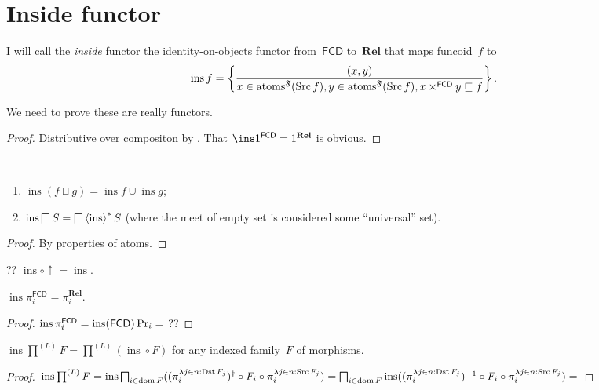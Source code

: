 \chapter{Inside functor}

\begin{defn}
I will call the \emph{inside} functor the identity-on-objects functor from~$\mathsf{FCD}$ to~$\mathbf{Rel}$ that maps
funcoid~$f$ to
\[
\operatorname{ins} f =
\left\{ \frac{(x,y)}{x\in\operatorname{atoms}^{\mathfrak{F}}(\operatorname{Src} f), y\in\operatorname{atoms}^{\mathfrak{F}}(\operatorname{Src} f), x\times^{\mathsf{FCD}}y\sqsubseteq f}\right\}. \]
\end{defn}

We need to prove these are really functors.

\begin{proof}
Distributive over compositon by \cite[proposition~]{volume-1}.
That $\ins 1^{\mathsf{FCD}} = 1^{\mathbf{Rel}}$ is obvious.
\end{proof}

\begin{prop}
~
\begin{enumerate}
\item $\operatorname{ins}(f\sqcup g)=\operatorname{ins}f\cup\operatorname{ins}g$;
\item $\operatorname{ins}\bigsqcap S=\bigsqcap\left\langle \operatorname{ins}\right\rangle ^{\ast}S$ (where the meet of empty set is considered some ``universal'' set).
\end{enumerate}
\end{prop}

\begin{proof}
By properties of atoms.
\end{proof}

\begin{prop}
?? $\operatorname{ins}\circ\uparrow = \operatorname{ins}$.
\end{prop}

\begin{prop}
$\operatorname{ins}\pi^{\mathsf{FCD}}_i=\pi^{\mathbf{Rel}}_i$.
\end{prop}

\begin{proof}
$\operatorname{ins}\pi^{\mathsf{FCD}}_i=\operatorname{ins}(\mathsf{FCD})\Pr_i=$
??
\end{proof}

\begin{prop}
$\operatorname{ins}\prod^{(L)}F =
\prod^{(L)}(\operatorname{ins}\circ F)$ for any indexed family~$F$ of morphisms.
\end{prop}

\begin{proof}
$\operatorname{ins}\prod^{(L)}F =
\operatorname{ins}\bigsqcap_{i \in \operatorname{dom} F} ((\pi^{\lambda j \in n :
\operatorname{Dst} F_j}_i)^{\dagger} \circ F_i \circ \pi^{\lambda j \in n :
\operatorname{Src} F_j}_i) =
\bigsqcap_{i \in \operatorname{dom} F}\operatorname{ins} ((\pi^{\lambda j \in n :
\operatorname{Dst} F_j}_i)^{-1} \circ F_i \circ \pi^{\lambda j \in n :
\operatorname{Src} F_j}_i) =
$
\end{proof}